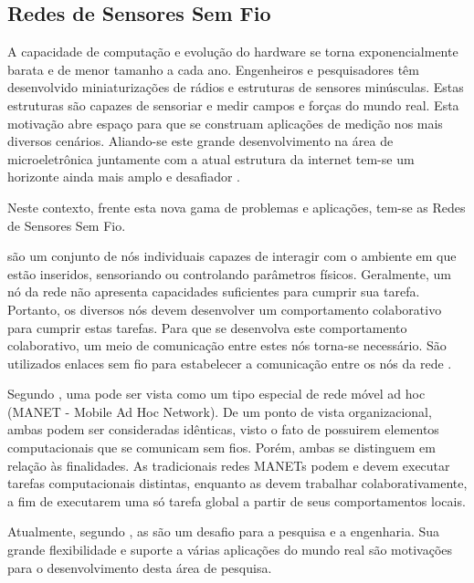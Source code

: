 \subsection{Redes de Sensores Sem Fio}

A capacidade de computação e evolução do hardware se torna exponencialmente barata e de menor tamanho a cada ano. Engenheiros e pesquisadores têm desenvolvido miniaturizações de rádios e estruturas de sensores minúsculas. Estas estruturas são capazes de sensoriar e medir campos e forças do mundo real. Esta motivação abre espaço para que se construam aplicações de medição nos mais diversos cenários. Aliando-se este grande desenvolvimento na área de microeletrônica juntamente com a atual estrutura da internet tem-se um horizonte ainda mais amplo e desafiador \cite{Culler2004}. 

Neste contexto, frente esta nova gama de problemas e aplicações, tem-se as Redes de Sensores Sem Fio.

\wsn  são um conjunto de nós individuais capazes de interagir com o ambiente em que estão inseridos, sensoriando ou controlando parâmetros físicos.
Geralmente, um nó da rede não apresenta capacidades suficientes para cumprir sua tarefa. Portanto, os diversos nós devem desenvolver um comportamento colaborativo para cumprir estas tarefas. Para que se desenvolva este comportamento colaborativo, um meio de comunicação entre estes nós torna-se necessário. São utilizados enlaces sem fio para estabelecer a comunicação entre os nós da rede \cite{Holger2005}.


Segundo \cite{Loureiro}, uma \rssf pode ser vista como um tipo especial de rede móvel ad hoc (MANET - Mobile Ad Hoc Network). De um ponto de vista organizacional, ambas podem ser consideradas idênticas, visto o fato de possuirem elementos computacionais que se comunicam sem fios. Porém, ambas se distinguem em relação às finalidades. As tradicionais redes MANETs podem e devem executar tarefas computacionais distintas, enquanto as \rssfs devem trabalhar colaborativamente, a fim de executarem uma só tarefa global a partir de seus comportamentos locais.

Atualmente, segundo \cite{Holger2005}, as \rssfs são um desafio para a pesquisa e a engenharia. Sua grande flexibilidade e suporte a várias aplicações do mundo real são motivações para o desenvolvimento desta área de pesquisa.


